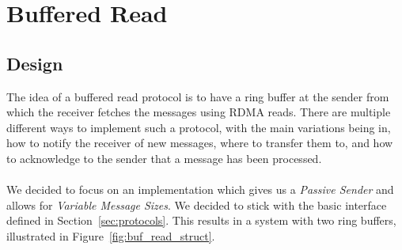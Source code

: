 
\section{Buffered Read}\label{sec:conn:buf_read}
\subsection{Design}

The idea of a buffered read protocol is to have a ring buffer at the sender from which the receiver fetches the messages using
RDMA reads. There are multiple different ways to implement such a protocol, with the main variations being in, how to notify
the receiver of new messages, where to transfer them to, and how to acknowledge to the sender that a message has been processed.

\paragraph{} We decided to focus on an implementation which gives us a \emph{Passive Sender} and allows for 
\emph{Variable Message Sizes}. We decided to stick with the basic interface defined in Section~\ref{sec:protocols}. This 
results in a system with two ring buffers, illustrated in Figure~\ref{fig:buf_read_struct}.

